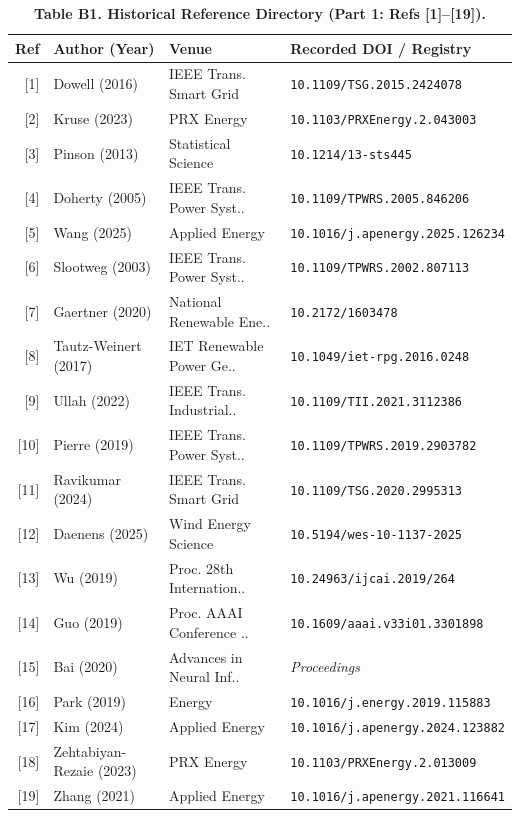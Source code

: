 \documentclass[
  journal]{IEEEtran}
\begin{document}
\begin{table}[!t]
\centering
\fontsize{8.0pt}{9.6pt}\selectfont
\setlength{\tabcolsep}{4pt}
\renewcommand{\arraystretch}{1.05}
\caption*{\textbf{Table B1. Historical Reference Directory (Part 1: Refs [1]--[19]).}}
%
\setlength{\tabcolsep}{4pt}
\begin{tabular}{rlll}
\toprule
\textbf{Ref} & \textbf{Author (Year)} & \textbf{Venue} & \textbf{Recorded DOI / Registry} \\
\midrule
{[1]} & Dowell (2016) & IEEE Trans. Smart Grid & \texttt{10.1109/TSG.2015.2424078} \\
{[2]} & Kruse (2023) & PRX Energy & \texttt{10.1103/PRXEnergy.2.043003} \\
{[3]} & Pinson (2013) & Statistical Science & \texttt{10.1214/13-sts445} \\
{[4]} & Doherty (2005) & IEEE Trans. Power Syst.. & \texttt{10.1109/TPWRS.2005.846206} \\
{[5]} & Wang (2025) & Applied Energy & \texttt{10.1016/j.apenergy.2025.126234} \\
{[6]} & Slootweg (2003) & IEEE Trans. Power Syst.. & \texttt{10.1109/TPWRS.2002.807113} \\
{[7]} & Gaertner (2020) & National Renewable Ene.. & \texttt{10.2172/1603478} \\
{[8]} & Tautz-Weinert (2017) & IET Renewable Power Ge.. & \texttt{10.1049/iet-rpg.2016.0248} \\
{[9]} & Ullah (2022) & IEEE Trans. Industrial.. & \texttt{10.1109/TII.2021.3112386} \\
{[10]} & Pierre (2019) & IEEE Trans. Power Syst.. & \texttt{10.1109/TPWRS.2019.2903782} \\
{[11]} & Ravikumar (2024) & IEEE Trans. Smart Grid & \texttt{10.1109/TSG.2020.2995313} \\
{[12]} & Daenens (2025) & Wind Energy Science & \texttt{10.5194/wes-10-1137-2025} \\
{[13]} & Wu (2019) & Proc. 28th Internation.. & \texttt{10.24963/ijcai.2019/264} \\
{[14]} & Guo (2019) & Proc. AAAI Conference .. & \texttt{10.1609/aaai.v33i01.3301898} \\
{[15]} & Bai (2020) & Advances in Neural Inf.. & \textit{Proceedings} \\
{[16]} & Park (2019) & Energy & \texttt{10.1016/j.energy.2019.115883} \\
{[17]} & Kim (2024) & Applied Energy & \texttt{10.1016/j.apenergy.2024.123882} \\
{[18]} & Zehtabiyan-Rezaie (2023) & PRX Energy & \texttt{10.1103/PRXEnergy.2.013009} \\
{[19]} & Zhang (2021) & Applied Energy & \texttt{10.1016/j.apenergy.2021.116641} \\
\bottomrule
\end{tabular}
\end{table}
\end{document}
